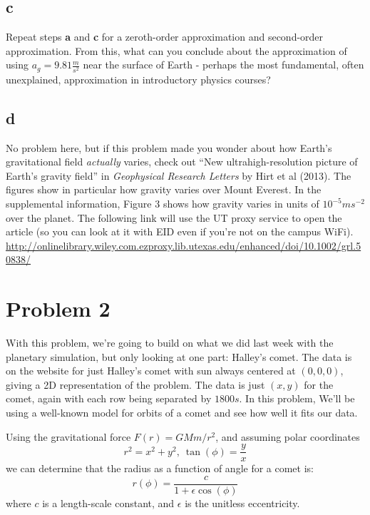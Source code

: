 \documentclass{article}
\begin{document}
\subsection{c}
Repeat steps {\bf{a}} and {\bf{c}} for a zeroth-order approximation and second-order approximation. From this, what can you conclude about the approximation of using
$a_g=9.81\frac{m}{s^2}$ near the surface of Earth - perhaps the most fundamental, often unexplained, approximation in introductory physics courses?

\subsection{d}
No problem here, but if this problem made you wonder about how Earth's gravitational field \emph{actually} varies, check out ``New ultrahigh-resolution picture of Earth's gravity field'' in
\emph{Geophysical Research Letters} by Hirt et al (2013). The figures show in particular how gravity varies over Mount Everest. In the supplemental information, Figure 3 shows how gravity
varies in units of $10^{-5}ms^{-2}$ over the planet. The following link will use the UT proxy service to open the article (so you can look at it with EID even if you're not on the campus WiFi).
\url{http://onlinelibrary.wiley.com.ezproxy.lib.utexas.edu/enhanced/doi/10.1002/grl.50838/}

\section{Problem 2}
With this problem, we're going to build on what we did last week with the planetary simulation, but only looking at one part: Halley's comet. The data is on the website for just Halley's comet
with sun always centered at $(0,0,0)$, giving a 2D representation of the problem. The data is just $(x,y)$ for the comet, again with each row being separated by $1800s$. In this problem,
We'll be using a well-known model for orbits of a comet and see how well it fits our data.

Using the gravitational force $F(r)=GMm/r^2$, and assuming polar coordinates $$r^2=x^2+y^2,~\tan(\phi)=\frac{y}{x}$$ we can\cite{taylor} determine that the radius as a function
of angle for a comet is: $$r(\phi)=\frac{c}{1+\epsilon\cos(\phi)}$$ where $c$ is a length-scale constant, and $\epsilon$ is the unitless eccentricity.
\end{document}

